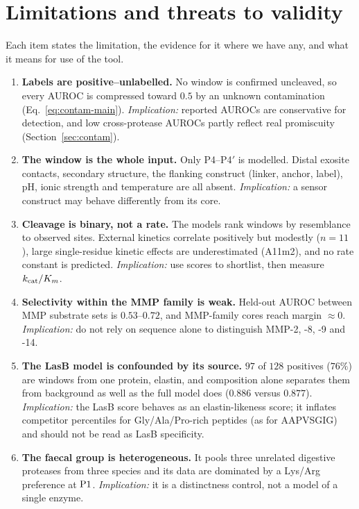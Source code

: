 \section{Limitations and threats to validity}
\label{sec:limits}

Each item states the limitation, the evidence for it where we have any, and what it means for use of the tool.

\begin{enumerate}
\item \textbf{Labels are positive--unlabelled.} No window is confirmed uncleaved, so every AUROC is compressed toward $0.5$ by an unknown contamination (Eq.~\ref{eq:contam-main}). \emph{Implication:} reported AUROCs are conservative for detection, and low cross-protease AUROCs partly reflect real promiscuity (Section~\ref{sec:contam}).
\item \textbf{The window is the whole input.} Only P4--P4$'$ is modelled. Distal exosite contacts, secondary structure, the flanking construct (linker, anchor, label), pH, ionic strength and temperature are all absent. \emph{Implication:} a sensor construct may behave differently from its core.
\item \textbf{Cleavage is binary, not a rate.} The models rank windows by resemblance to observed sites. External kinetics correlate positively but modestly ($n=11$), large single-residue kinetic effects are underestimated (A11m2), and no rate constant is predicted. \emph{Implication:} use scores to shortlist, then measure $k_{\mathrm{cat}}/K_m$.
\item \textbf{Selectivity within the MMP family is weak.} Held-out AUROC between MMP substrate sets is $0.53$--$0.72$, and MMP-family cores reach margin $\approx0$. \emph{Implication:} do not rely on sequence alone to distinguish MMP-2, -8, -9 and -14.
\item \textbf{The LasB model is confounded by its source.} $97$ of $128$ positives ($76\%$) are windows from one protein, elastin, and composition alone separates them from background as well as the full model does ($0.886$ versus $0.877$). \emph{Implication:} the LasB score behaves as an elastin-likeness score; it inflates competitor percentiles for Gly/Ala/Pro-rich peptides (as for AAPVSGIG) and should not be read as LasB specificity.
\item \textbf{The faecal group is heterogeneous.} It pools three unrelated digestive proteases from three species and its data are dominated by a Lys/Arg preference at $\mathrm{P}1$. \emph{Implication:} it is a distinctness control, not a model of a single enzyme.

\end{enumerate}
